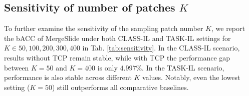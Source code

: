 \documentclass[10pt,twocolumn,letterpaper]{article}
\begin{document}
\subsection{Sensitivity of number of patches $K$}

{To further examine the sensitivity of the sampling patch number $K$, we report the bACC of MergeSlide under both CLASS-IL and TASK-IL settings for $K \in {50, 100, 200, 300, 400}$ in Tab. \ref{tab:sensitivity}. In the CLASS-IL scenario, results without TCP remain stable, while with TCP the performance gap between $K=50$ and $K=400$ is only $4.997\%$. In the TASK-IL scenario, performance is also stable across different $K$ values. Notably, even the lowest setting ($K=50$) still outperforms all comparative baselines.}

\begin{table}[!h]
\caption{{Sensitivity of $K$ sampling patches under the CLASS-IL and TASK-IL scenarios on \textcolor{blue}{B}$\rightarrow$\textcolor{blue}{R}$\rightarrow$\textcolor{blue}{N}$\rightarrow$\textcolor{red}{E}$\rightarrow$\textcolor{red}{T}$\rightarrow$\textcolor{red}{C}.}}
\label{tab:sensitivity}
\end{table}
\end{document}
